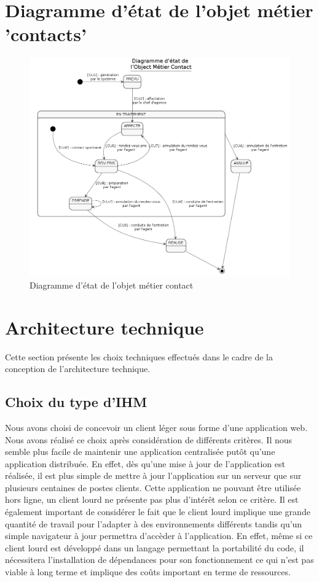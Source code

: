 \section{Diagramme d’état de l'objet métier 'contacts'}
\begin{figure}[H]
\centering
\includegraphics[width=\textwidth]{figures/diag_etats_contact}
\caption{Diagramme d'état de l'objet métier contact}
\end{figure}



\section{Architecture technique}


Cette section présente les choix techniques effectués dans le cadre de la conception de l'architecture technique.

\subsection{Choix du type d'IHM}

Nous avons choisi de concevoir un client léger sous forme d'une application web. Nous avons réalisé ce choix après considération de différents critères. Il nous semble plus facile de maintenir une application centralisée putôt qu'une application distribuée. En effet, dès qu'une mise à jour de l'application est réalisée, il est plus simple de mettre à jour l'application sur un serveur que sur plusieurs centaines de postes clients. Cette application ne pouvant être utilisée hors ligne, un client lourd ne présente pas plus d'intérêt selon ce critère. Il est également important de considérer le fait que le client lourd implique une grande quantité de travail pour l'adapter à des environnements différents tandis qu'un simple navigateur à jour permettra d'accèder à l'application. En effet, même si ce client lourd est développé dans un langage permettant la portabilité du code, il nécessitera l'installation de dépendances pour son fonctionnement ce qui n'est pas viable à long terme et implique des coûts important en terme de ressources. 

